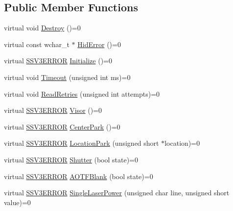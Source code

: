 \subsection*{Public Member Functions}
\begin{DoxyCompactItemize}
\item 
virtual void \hyperlink{classSSV3_1_1Controller_a04e0349b6adf3231bc57e6d7777861e6}{Destroy} ()=0
\item 
virtual const wchar\-\_\-t $\ast$ \hyperlink{classSSV3_1_1Controller_afa08d143fcf2c1e9974ac212fc816ed2}{Hid\-Error} ()=0
\item 
virtual \hyperlink{classSSV3_1_1Controller_a8ff24a92ec373aa1257dcfe2aa2e5406}{S\-S\-V3\-E\-R\-R\-O\-R} \hyperlink{classSSV3_1_1Controller_a09aad77f26ef4f1ae27746234188e9f1}{Initialize} ()=0
\item 
virtual void \hyperlink{classSSV3_1_1Controller_a44aa242157905527164269a57f4c0156}{Timeout} (unsigned int ms)=0
\item 
virtual void \hyperlink{classSSV3_1_1Controller_a8d1f7d629d46b94e92e0c580bc5ae24f}{Read\-Retries} (unsigned int attempts)=0
\item 
virtual \hyperlink{classSSV3_1_1Controller_a8ff24a92ec373aa1257dcfe2aa2e5406}{S\-S\-V3\-E\-R\-R\-O\-R} \hyperlink{classSSV3_1_1Controller_a8abc66a0ff313b8689a716b43ce696d2}{Visor} ()=0
\item 
virtual \hyperlink{classSSV3_1_1Controller_a8ff24a92ec373aa1257dcfe2aa2e5406}{S\-S\-V3\-E\-R\-R\-O\-R} \hyperlink{classSSV3_1_1Controller_a4d2e70f3ffd7fe0e00dcaeaa9981cd9f}{Center\-Park} ()=0
\item 
virtual \hyperlink{classSSV3_1_1Controller_a8ff24a92ec373aa1257dcfe2aa2e5406}{S\-S\-V3\-E\-R\-R\-O\-R} \hyperlink{classSSV3_1_1Controller_aa40583d5f5c907efc09a76256516b7d4}{Location\-Park} (unsigned short $\ast$location)=0
\item 
virtual \hyperlink{classSSV3_1_1Controller_a8ff24a92ec373aa1257dcfe2aa2e5406}{S\-S\-V3\-E\-R\-R\-O\-R} \hyperlink{classSSV3_1_1Controller_a1000e02a14b2ca598a9f2f851a05c4ed}{Shutter} (bool state)=0
\item 
virtual \hyperlink{classSSV3_1_1Controller_a8ff24a92ec373aa1257dcfe2aa2e5406}{S\-S\-V3\-E\-R\-R\-O\-R} \hyperlink{classSSV3_1_1Controller_a72eeeb9dec872bbcb230bb251c8439a4}{A\-O\-T\-F\-Blank} (bool state)=0
\item 
virtual \hyperlink{classSSV3_1_1Controller_a8ff24a92ec373aa1257dcfe2aa2e5406}{S\-S\-V3\-E\-R\-R\-O\-R} \hyperlink{classSSV3_1_1Controller_abd7191a0acc48689c737ec9cb820de58}{Single\-Laser\-Power} (unsigned char line, unsigned short value)=0

\end{DoxyCompactItemize}
